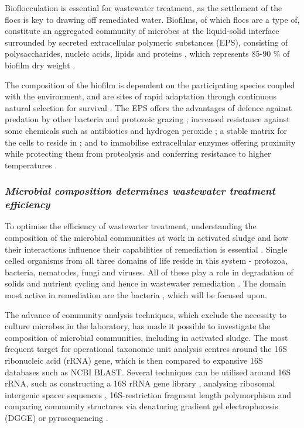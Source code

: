 \documentclass{article}
\begin{document}
Bioflocculation is essential for wastewater treatment, as the settlement of the flocs is key to drawing off remediated water. Biofilms, of which flocs are a type of, constitute an aggregated community of microbes at the liquid-solid interface surrounded by secreted extracellular polymeric substances (EPS), consisting of polysaccharides, nucleic acids, lipids and proteins \cite{wingender1999}, which represents 85-90 \% of biofilm dry weight \cite{Frolund_96}. 


The composition of the biofilm is dependent on the participating species coupled with the environment, and are sites of rapid adaptation through continuous natural selection for survival \cite{boles2008,matz2005,palmer2001}.  
The EPS offers the advantages of defence against predation by other bacteria \cite{rao2005} and protozoic grazing \cite{matz2005}; increased resistance against some chemicals such as antibiotics and hydrogen peroxide \cite{burmolle_06}; a stable matrix for the cells to reside in \cite{Flemming_10}; and to immobilise extracellular enzymes offering proximity while protecting them from proteolysis and conferring resistance to higher temperatures \cite{wingender2002extracellular,Flemming_10,skillman1998}.

\subsubsection{\emph{Microbial composition determines wastewater treatment efficiency}}
To optimise the efficiency of wastewater treatment, understanding the composition of the microbial communities at work in activated sludge and how their interactions influence their capabilities of remediation is essential \cite{daims2006}.
Single celled organisms from all three domains of life reside in this system - protozoa, bacteria, nematodes, fungi and viruses. All of these play a role in degradation of solids and nutrient cycling and hence in wastewater remediation \cite{muchie2010bioremediation}. The domain most active in remediation are the bacteria \cite{spellman2008handbook}, which will be focused upon.


The advance of community analysis techniques, which exclude the necessity to culture microbes in the laboratory, has made it possible to investigate the composition of microbial communities, including in activated sludge. The most frequent target for operational taxonomic unit analysis centres around the 16S ribonucleic acid (rRNA) gene, which is then compared to expansive 16S databases such as NCBI BLAST. Several techniques can be utilised around 16S rRNA, such as constructing a 16S rRNA gene library \cite{McGarvey_04}, analysing ribosomal intergenic spacer sequences \cite{Yu_01}, 16S-restriction fragment length polymorphism \cite{Gilbride_06} and comparing community structures via denaturing gradient gel electrophoresis (DGGE) \cite{Hesham_11} or pyrosequencing \cite{wang2012pyrosequencing}.
\end{document}
